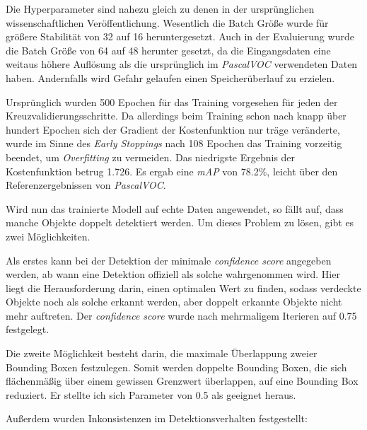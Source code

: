 Die Hyperparameter sind nahezu gleich zu denen in der ursprünglichen wissenschaftlichen Veröffentlichung. Wesentlich die Batch Größe wurde für größere Stabilität von 32 auf 16 heruntergesetzt. Auch in der Evaluierung wurde die Batch Größe von 64 auf 48 herunter gesetzt, da die Eingangsdaten eine weitaus höhere Auflösung als die ursprünglich im \textit{PascalVOC} verwendeten Daten haben. Andernfalls wird Gefahr gelaufen einen Speicherüberlauf zu erzielen. 

Ursprünglich wurden 500 Epochen für das Training vorgesehen für jeden der Kreuzvalidierungsschritte. Da allerdings beim Training schon nach knapp über hundert Epochen sich der Gradient der Kostenfunktion nur träge veränderte, wurde im Sinne des \textit{Early Stoppings} nach 108 Epochen das Training vorzeitig beendet, um \textit{Overfitting} zu vermeiden. Das niedrigste Ergebnis der Kostenfunktion betrug 1.726. Es ergab eine \textit{mAP} von 78.2\%, leicht über den Referenzergebnissen von \textit{PascalVOC}. 

Wird nun das trainierte Modell auf echte Daten angewendet, so fällt auf, dass manche Objekte doppelt detektiert werden. Um dieses Problem zu lösen, gibt es zwei Möglichkeiten. 

Als erstes kann bei der Detektion der minimale \textit{confidence score} angegeben werden, ab wann eine Detektion offiziell als solche wahrgenommen wird. Hier liegt die Herausforderung darin, einen optimalen Wert zu finden, sodass verdeckte Objekte noch als solche erkannt werden, aber doppelt erkannte Objekte nicht mehr auftreten. Der \textit{confidence score} wurde nach mehrmaligem Iterieren auf 0.75 festgelegt.

Die zweite Möglichkeit besteht darin, die maximale Überlappung zweier Bounding Boxen festzulegen. Somit werden doppelte Bounding Boxen, die sich flächenmäßig über einem gewissen Grenzwert überlappen, auf eine Bounding Box reduziert. Er stellte ich sich Parameter von 0.5 als geeignet heraus.

Außerdem wurden Inkonsistenzen im Detektionsverhalten festgestellt:

